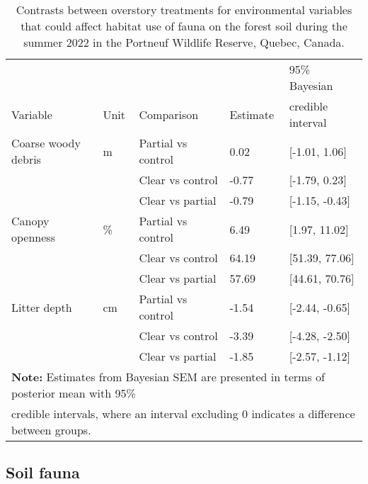 \begin{table}[ht]
  \centering
  \caption[Contrasts between overstory treatments for environmental variables that could affect habitat selection of fauna on the forest soil.]
  {Contrasts between overstory treatments for environmental variables that could affect habitat use of fauna on the forest soil during the summer 2022 in the Portneuf Wildlife Reserve,
  Quebec, Canada.}
  \label{tab:overstoryenvar}
  \begin{tabular}{lllll} 
      \hline
      &&&&95\% Bayesian \\
      Variable&Unit& Comparison & Estimate &  credible interval \\ [0.5ex] 
      \hline
      Coarse woody debris &m\up{3}& Partial vs control & \hspace{1mm}0.02 & [-1.01, 1.06] \\ 
                 && Clear vs control  & -0.77 & [-1.79, 0.23] \\ 
                          && Clear vs partial  & -0.79 & [-1.15, -0.43] \\
      Canopy openness     &\%& Partial vs control & \hspace{1mm}6.49 & [1.97, 11.02] \\ 
                      && Clear vs control  & \hspace{1mm}64.19 & [51.39, 77.06] \\ 
                          && Clear vs partial  & \hspace{1mm}57.69 & [44.61, 70.76] \\ 
      Litter depth        &cm& Partial vs control & -1.54 & [-2.44, -0.65] \\ 
                      && Clear vs control  & -3.39 & [-4.28, -2.50] \\ 
                          && Clear vs partial  & -1.85 & [-2.57, -1.12] \\       
      \hline
      \multicolumn{5}{l}{\textbf{Note:} Estimates from Bayesian SEM are presented in terms of posterior mean with 95\%} \\
      \multicolumn{5}{l}{credible intervals, where an interval excluding 0 indicates a difference between groups.} \\
  \end{tabular}
\end{table}

\pagebreak


\subsection*{Soil fauna}
\label{subsec:taxa}

